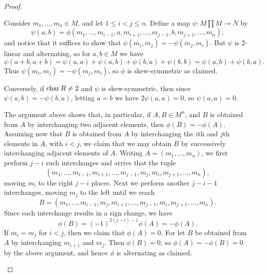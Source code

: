 \begin{proof}
\begin{proofsec*}
    \item[\itemref{enum:alternating-implies-skew-symmetric}]
    Consider $m_1, \ldots, m_n \in M$, and let $1 \leq i < j \leq n$. Define a map $\psi \colon M \prod M \to N$ by
    \begin{equation*}
        \psi(a, b)
            = \phi(m_1, \ldots, m_{i-1}, a, m_{i+1}, \ldots, m_{j-1}, b, m_{j+1}, \ldots, m_n),
    \end{equation*}
    and notice that it suffices to show that $\psi(m_i,m_j) = -\psi(m_j,m_i)$. But $\psi$ is $2$-linear and alternating, so for $a,b \in M$ we have
    \begin{equation*}
        \psi(a+b, a+b)
            = \psi(a,a) + \psi(a,b) + \psi(b,a) + \psi(b,b)
            = \psi(a,b) + \psi(b,a).
    \end{equation*}
    Thus $\psi(m_i,m_j) = -\psi(m_j,m_i)$, so $\phi$ is skew-symmetric as claimed.

    Conversely, if $\operatorname{char} R \neq 2$ and $\psi$ is skew-symmetric, then since $\psi(a,b) = -\psi(b,a)$, letting $a = b$ we have $2\psi(a,a) = 0$, so $\psi(a,a) = 0$.

    \item[\itemref{enum:alternating-adjacent-rows}] 
    The argument above shows that, in particular, if $A, B \in M^n$, and $B$ is obtained from $A$ by interchanging two adjacent elements, then $\phi(B) = -\phi(A)$. Assuming now that $B$ is obtained from $A$ by interchanging the $i$th and $j$th elements in $A$, with $i < j$, we claim that we may obtain $B$ by successively interchanging adjacent elements of $A$. Writing $A = (m_1, \ldots, m_n)$, we first perform $j - i$ such interchanges and arrive that the tuple
    \begin{equation*}
        (m_1, \ldots, m_{i-1}, m_{i+1}, \ldots, m_{j-1}, m_j, m_i, m_{j+1}, \ldots, m_n),
    \end{equation*}
    moving $m_i$ to the right $j - i$ places. Next we perform another $j-i-1$ interchanges, moving $m_j$ to the left until we reach
    \begin{equation*}
        B = (m_1, \ldots, m_{i-1}, m_j, m_{i+1}, \ldots, m_{j-1}, m_i, m_{j+1}, \ldots, m_n).
    \end{equation*}
    Since each interchange results in a sign change, we have
    \begin{equation*}
        \phi(B) = (-1)^{2(j-i) - 1} \phi(A) = -\phi(A).
    \end{equation*}
    If $m_i = m_j$ for $i < j$, then we claim that $\phi(A) = 0$. For let $B$ be obtained from $A$ by interchanging $m_{i+1}$ and $m_j$. Then $\phi(B) = 0$, so $\phi(A) = -\phi(B) = 0$ by the above argument, and hence $\phi$ is alternating as claimed.
    \end{proofsec*}
\end{proof}

